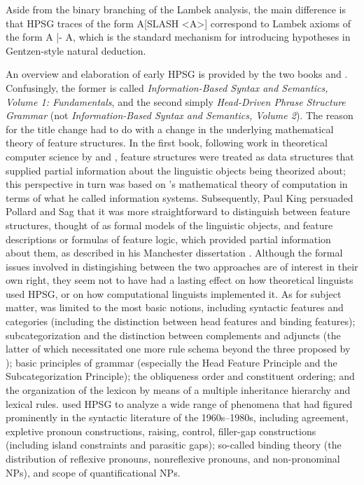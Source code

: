 \documentclass[output=paper]{langsci/langscibook}
\begin{document}
\noindent
Aside from the binary branching of the Lambek analysis, the main difference is that HPSG traces of the form A[SLASH <A>] correspond
to Lambek axioms of the form A |- A, which is the standard mechanism for introducing hypotheses in Gentzen-style natural deduction.

An overview and elaboration of early HPSG is provided by the two books \citet{ps} and \citet{ps2}. Confusingly, the former is called \textit{Information-Based Syntax and Semantics, Volume 1: Fundamentals}, and the second simply \textit{Head-Driven Phrase Structure Grammar} (not \textit{Information-Based Syntax and Semantics, Volume 2}). The reason for the title change had to do with a change in the underlying mathematical theory of feature structures. In the first book, following work in theoretical computer science by \citet{RoundsKasper1986} and \citet{MoshierRounds1987}, feature structures were treated as data structures that supplied partial information about the linguistic objects being theorized about; this perspective in turn was based on \citet{Scott1982}'s mathematical theory of computation in terms of what he called information systems. Subsequently, Paul King persuaded Pollard and Sag that it was more straightforward to distinguish between feature structures, thought of as formal models of the linguistic objects, and feature descriptions or formulas of feature logic, which provided partial information about them, as described in his Manchester dissertation \citep{King89}.  Although the formal issues involved in distingishing between the two approaches are of interest in their own right, they seem not to have had a lasting effect on how theoretical linguists used HPSG, or on how computational linguists implemented it. As for subject matter, \citet{ps} was limited to the most basic notions, including syntactic features and categories (including the distinction between head features and binding features); subcategorization and the distinction between complements and adjuncts (the latter of which necessitated one more rule schema beyond the three proposed by \citet{Pollard85a-u}); basic principles of grammar (especially the Head Feature Principle and the Subcategorization Principle); the obliqueness order and constituent ordering; and the organization of the lexicon by means of a multiple inheritance hierarchy and lexical rules. \citet{ps2} used HPSG to analyze a wide range of phenomena that had figured prominently in the syntactic literature of the 1960s--1980s, including agreement, expletive pronoun constructions, raising, control, filler-gap constructions (including island constraints and parasitic gaps); so-called binding theory (the distribution of reflexive pronouns, nonreflexive pronouns, and non-pronominal NPs), and scope of quantificational NPs.
\end{document}
